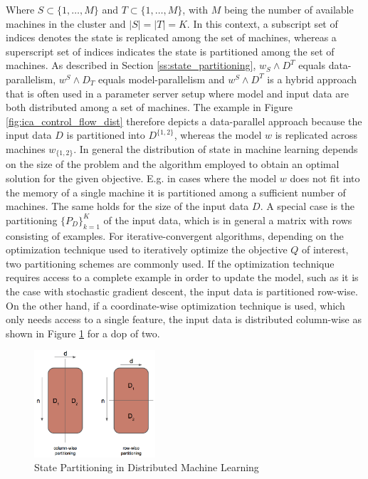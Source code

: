 Where $S \subset \{1, \ldots, M\}$ and $T \subset \{1, \ldots, M\}$, with $M$ being the number of available machines in the cluster and $\mid S \mid = \mid T \mid = K$.
In this context, a subscript set of indices denotes the state is replicated among the set of machines, whereas a superscript set of indices indicates the state is partitioned among the set of machines.
As described in Section \ref{ss:state_partitioning}, $w_S \wedge D^T$ equals data-parallelism, $w^S \wedge D_T$ equals model-parallelism and $w^S \wedge D^T$ is a hybrid approach that is often used in a parameter server setup where model and input data are both distributed among a set of machines.
The example in Figure \ref{fig:ica_control_flow_dist} therefore depicts a data-parallel approach because the input data $D$ is partitioned into $D^{\{1,2\}}$, whereas the model $w$ is replicated across machines $w_{\{1,2\}}$.
In general the distribution of state in machine learning depends on the size of the problem and the algorithm employed to obtain an optimal solution for the given objective.
E.g. in cases where the model $w$ does not fit into the memory of a single machine it is partitioned among a sufficient number of machines.
The same holds for the size of the input data $D$.
A special case is the partitioning $\{P_D\}_{k=1}^K$ of the input data, which is in general a matrix with rows consisting of examples.
For iterative-convergent algorithms, depending on the optimization technique used to iteratively optimize the objective $Q$ of interest, two partitioning schemes are commonly used.
If the optimization technique requires access to a complete example in order to update the model, such as it is the case with stochastic gradient descent, the input data is partitioned row-wise.
On the other hand, if a coordinate-wise optimization technique is used, which only needs access to a single feature, the input data is distributed column-wise as shown in Figure \ref{fig:row_col_dist} for a dop of two.
\begin{figure}[ht]
\centering
\includegraphics[width=0.4\textwidth]{img/row_col_dist.png}
\caption{State Partitioning in Distributed Machine Learning}
\label{fig:row_col_dist}
\end{figure}
